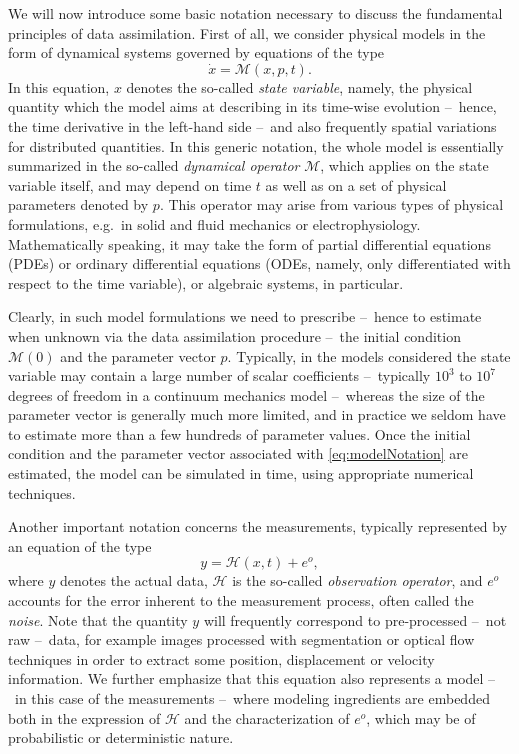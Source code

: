 \documentclass{tufte-book}
\begin{document}
We will now introduce some basic notation necessary to discuss the fundamental principles of data assimilation. First of all, we consider physical models in the form of dynamical systems governed by equations of the type
\begin{equation}\label{eq:modelNotation}
	\dot{x} = \mathcal{M}(x,p,t).
\end{equation}
In this equation, $x$ denotes the so-called \emph{state variable}, namely, the physical quantity which the model aims at describing in its time-wise evolution --~hence, the time derivative in the left-hand side --~and also frequently spatial variations for distributed quantities. In this generic notation, the whole model is essentially summarized in the so-called \emph{dynamical operator} $\mathcal{M}$, which applies on the state variable itself, and may depend on time $t$ as well as on a set of physical parameters denoted by $p$. This operator may arise from various types of physical formulations, e.g.~in solid and fluid mechanics or electrophysiology. Mathematically speaking, it may take the form of partial differential equations (PDEs) or ordinary differential equations (ODEs, namely, only differentiated with respect to the time variable), or algebraic systems, in particular.

Clearly, in such model formulations we need to prescribe --~hence to estimate when unknown via the data assimilation procedure --~the initial condition $\mathcal{M}(0)$ and the parameter vector $p$. Typically, in the models considered the state variable may contain a large number of scalar coefficients --~typically $10^3$ to $10^7$ degrees of freedom in a continuum mechanics model --~whereas the size of the parameter vector is generally much more limited, and in practice we seldom have to estimate more than a few hundreds of parameter values. Once the initial condition and the parameter vector associated with \eqref{eq:modelNotation} are estimated, the model can be simulated in time, using appropriate numerical techniques.

Another important notation concerns the measurements, typically represented by an equation of the type
\begin{equation}\label{eq:measNotation}
	y = \mathcal{H}(x,t) + e^o,
\end{equation}
where $y$ denotes the actual data, $\mathcal{H}$ is the so-called \emph{observation operator}, and $e^o$ accounts for the error inherent to the measurement process, often called the \emph{noise}. Note that the quantity $y$ will frequently correspond to pre-processed --~not raw --~data, for example images processed with segmentation or optical flow techniques in order to extract some position, displacement or velocity information. We further emphasize that this equation also represents a model --~in this case of the measurements --~where modeling ingredients are embedded both in the expression of $\mathcal{H}$ and the characterization of $e^o$, which may be of probabilistic or deterministic nature.
\end{document}
